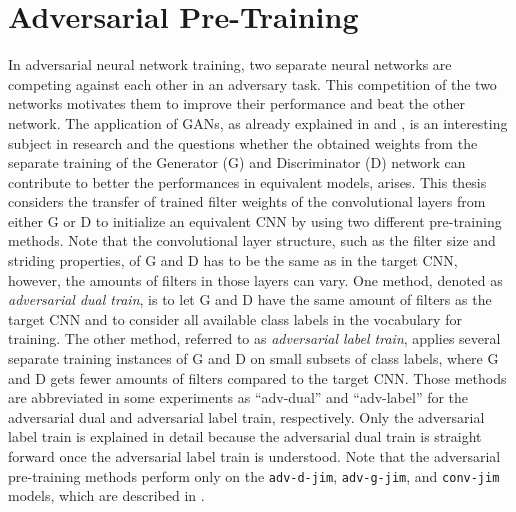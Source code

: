 
\section{Adversarial Pre-Training}\label{sec:nn_adv}
In adversarial neural network training, two separate neural networks are competing against each other in an adversary task.
This competition of the two networks motivates them to improve their performance and beat the other network.
The application of GANs, as already explained in  and , is an interesting subject in research and the questions whether the obtained weights from the separate training of the Generator (G) and Discriminator (D) network can contribute to better the performances in equivalent models, arises.
This thesis considers the transfer of trained filter weights of the convolutional layers from either G or D to initialize an equivalent CNN by using two different pre-training methods.
Note that the convolutional layer structure, such as the filter size and striding properties, of G and D has to be the same as in the target CNN, however, the amounts of filters in those layers can vary.
One method, denoted as \emph{adversarial dual train}, is to let G and D have the same amount of filters as the target CNN and to consider all available class labels in the vocabulary for training.
The other method, referred to as \emph{adversarial label train}, applies several separate training instances of G and D on small subsets of class labels, where G and D gets fewer amounts of filters compared to the target CNN.
Those methods are abbreviated in some experiments as \enquote{adv-dual} and \enquote{adv-label} for the adversarial dual and adversarial label train, respectively.
Only the adversarial label train is explained in detail because the adversarial dual train is straight forward once the adversarial label train is understood.
Note that the adversarial pre-training methods perform only on the \texttt{adv-d-jim}, \texttt{adv-g-jim}, and \texttt{conv-jim} models, which are described in .



